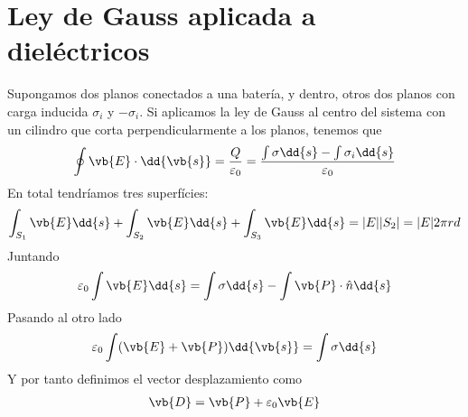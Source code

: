\documentclass{./FisicaII.tex}
\begin{document}
\section{Ley de Gauss aplicada a dieléctricos}
Supongamos dos planos conectados a una batería, y dentro, otros dos planos con carga
inducida \(\sigma _{i}\) y \(-\sigma _{i}\). Si aplicamos la ley de Gauss al centro del
sistema con un cilindro que corta perpendicularmente a los planos, tenemos que
\[
	\oint \vb{E} \cdot \dd{\vb{s}} = \frac{Q}{\varepsilon_{0}} = 
	\frac{\int \sigma  \dd{s} - \int \sigma _{i}\dd{s}}{\varepsilon _{0}}
\]
En total tendríamos tres superfícies:
\[
	\int_{S_{1}} \vb{E} \dd{s} + \int_{S_{2}} \vb{E}\dd{s} + \int_{S_{3}}\vb{E}\dd{s}
	= |E||S_{2}| = |E|2 \pi r d
\]
Juntando
\[
	\varepsilon _{0} \int \vb{E} \dd{s} = \int \sigma \dd{s} - \int \vb{P} \cdot \hat{n}\dd{s}
\]
Pasando al otro lado
\[
	\varepsilon _{0} \int (\vb{E}+\vb{P} )\dd{\vb{s}} = \int \sigma \dd{s}
\]
Y por tanto definimos el vector desplazamiento como
\begin{equation}
	\begin{split}
		\vb{D} = \vb{P} + \varepsilon _{0} \vb{E}
	\end{split}
\end{equation}
\end{document}
